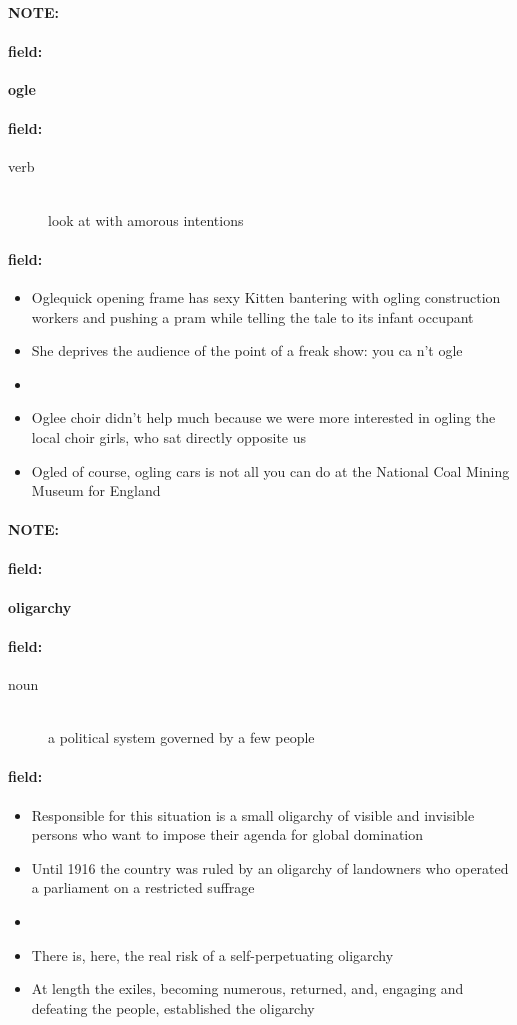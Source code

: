 \documentclass[12pt]{article}
\newenvironment{note}{\paragraph{NOTE:}}{}
\newenvironment{field}{\paragraph{field:}}{}
\begin{document}
\begin{note}
\begin{field}
\textbf{\large ogle}
\end{field}


\begin{field}
\begin{description}
\item[verb] \hfill \\ 
look at with amorous intentions

\end{description}
\end{field}

\begin{field}
\begin{itemize}
\item Oglequick opening frame has sexy Kitten bantering with ogling construction workers and pushing a pram while telling the tale to its infant occupant
\item She deprives the audience of the point of a freak show: you ca n't ogle
\item 
\item Oglee choir didn't help much because we were more interested in ogling the local choir girls, who sat directly opposite us
\item Ogled of course, ogling cars is not all you can do at the National Coal Mining Museum for England
\end{itemize}
\end{field}
\end{note}
\begin{note}
\begin{field}
\textbf{\large oligarchy}
\end{field}


\begin{field}
\begin{description}
\item[noun] \hfill \\ 
a political system governed by a few people

\end{description}
\end{field}

\begin{field}
\begin{itemize}
\item Responsible for this situation is a small oligarchy of visible and invisible persons who want to impose their agenda for global domination
\item Until 1916 the country was ruled by an oligarchy of landowners who operated a parliament on a restricted suffrage
\item 
\item There is, here, the real risk of a self-perpetuating oligarchy
\item At length the exiles, becoming numerous, returned, and, engaging and defeating the people, established the oligarchy
\end{itemize}
\end{field}
\end{note}
\end{document}
